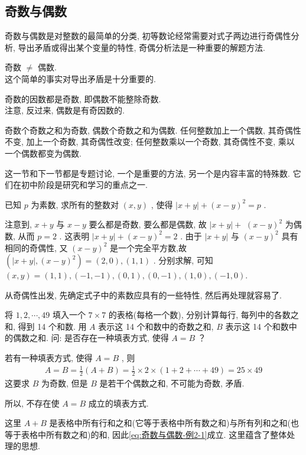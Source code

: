 \subsection{奇数与偶数}
奇数与偶数是对整数的最简单的分类, 初等数论经常需要对式子两边进行奇偶性分析, 导出矛盾或得出某个变量的特性, 奇偶分析法是一种重要的解题方法.
\begin{property}
	奇数 $\neq$ 偶数. \\
	这个简单的事实对导出矛盾是十分重要的.
\end{property}

\begin{property}
	奇数的因数都是奇数, 即偶数不能整除奇数. \\
	注意, 反过来, 偶数是有奇因数的.
\end{property}

\begin{property}
	奇数个奇数之和为奇数, 偶数个奇数之和为偶数. 任何整数加上一个偶数, 其奇偶性不变, 加上一个奇数, 其奇偶性改变; 任何整数乘以一个奇数, 其奇偶性不变, 乘以一个偶数都变为偶数.
\end{property}

这一节和下一节都是专题讨论, 一个是重要的方法, 另一个是内容丰富的特殊数. 它们在初中阶段是研究和学习的重点之一.

\begin{example}
	已知 $p$ 为素数, 求所有的整数对 $(x, y)$ , 使得 $|x+y|+(x-y)^{2}=p$ .
\end{example}
\begin{solution}
	注意到,  $x+y$ 与 $x-y$ 要么都是奇数, 要么都是偶数, 故 $|x+y|+$ $(x-y)^{2}$ 为偶数, 从而 $p=2$ . 这表明 $|x+y|+(x-y)^{2}=2$ .
	由于 $|x+y|$ 与 $(x-y)^{2}$ 具有相同的奇偶性, 又 $(x-y)^{2}$ 是一个完全平方数,故 $\left(|x+y|,(x-y)^{2}\right)=(2,0),(1,1)$ . 分别求解, 可知
	$(x, y)=(1,1),(-1,-1),(0,1),(0,-1),(1,0),(-1,0)$.
\end{solution}
\begin{note}
	从奇偶性出发, 先确定式子中的素数应具有的一些特性, 然后再处理就容易了.
\end{note}

\begin{example}
	将 $1,2, \cdots, 49$ 填入一个 $7 \times 7$ 的表格(每格一个数), 分别计算每行, 每列中的各数之和, 得到 14 个和数. 用 $A$ 表示这 14 个和数中的奇数之和,  $B$ 表示这 14 个和数中的偶数之和. 问: 是否存在一种填表方式, 使得 $A=B$ ？
\end{example}
\begin{solution}
	若有一种填表方式, 使得 $A=B$ , 则
	\begin{align}\label{eq:奇数与偶数-例2-1}
		A=B=\frac{1}{2}(A+B)=\frac{1}{2} \times 2 \times(1+2+\cdots+49)=25 \times 49
	\end{align}
	这要求 $B$ 为奇数, 但是 $B$ 是若干个偶数之和, 不可能为奇数, 矛盾.

	所以, 不存在使 $A=B$ 成立的填表方式.
\end{solution}
\begin{note}
	这里 $A+B$ 是表格中所有行和之和(它等于表格中所有数之和)与所有列和之和(也等于表格中所有数之和)的和, 因此\autoref{eq:奇数与偶数-例2-1}成立. 这里蕴含了整体处理的思想.
\end{note}

